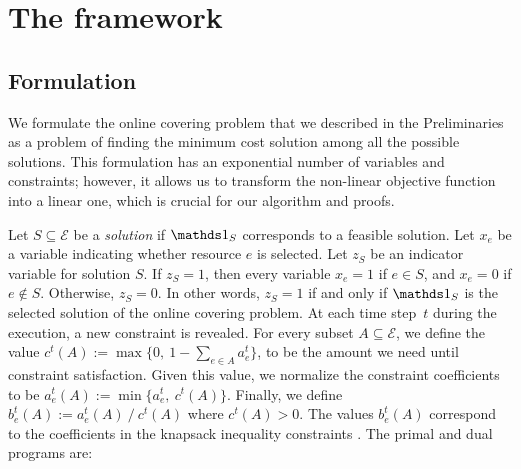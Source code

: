 
\section{The framework}		\label{sec:covering}

\subsection{Formulation}
We formulate the online covering problem that we described in the Preliminaries as a problem of finding the minimum cost solution among all the possible solutions. This formulation has an exponential number of variables and constraints; however, it allows us to transform the non-linear objective function into a linear one, which is crucial for our algorithm and proofs.

Let $S \subseteq \mathcal{E}$ be a \emph{solution} if $\one_{S}$ corresponds to a feasible solution. Let $x_{e}$ be a variable indicating whether resource $e$ is selected.
Let $z_{S}$ be an indicator variable for solution $S$. If $z_{S} = 1$, then every variable
$x_{e} = 1$ if $e \in S$, and $x_{e} = 0$ if $e \notin S$. Otherwise, $z_S = 0$. In other words, $z_{S} = 1$ if and only if $\one_{S}$ is the selected solution of the online covering problem. At each time step~$t$ during the execution, a new constraint is revealed. For every subset $A \subseteq \mathcal{E}$, we define the value $c^{t}(A) := \max\{0,\ 1 - \sum_{e \in A} a^{t}_{e}\}$, to be the amount we need until constraint satisfaction. Given this value, we normalize the constraint coefficients to be $a^{t}_{e}(A) := \min\{a_{e}^{t},\ c^{t}(A)\}$. Finally, we define $b^{t}_{e}(A) := a^{t}_{e}(A)\ /\ c^{t}(A)$ where $c^{t}(A) > 0$. The values $b^{t}_{e}(A)$ correspond to the coefficients in the knapsack inequality constraints \citep{CarrFleischer:2000}. The primal and dual programs are:

